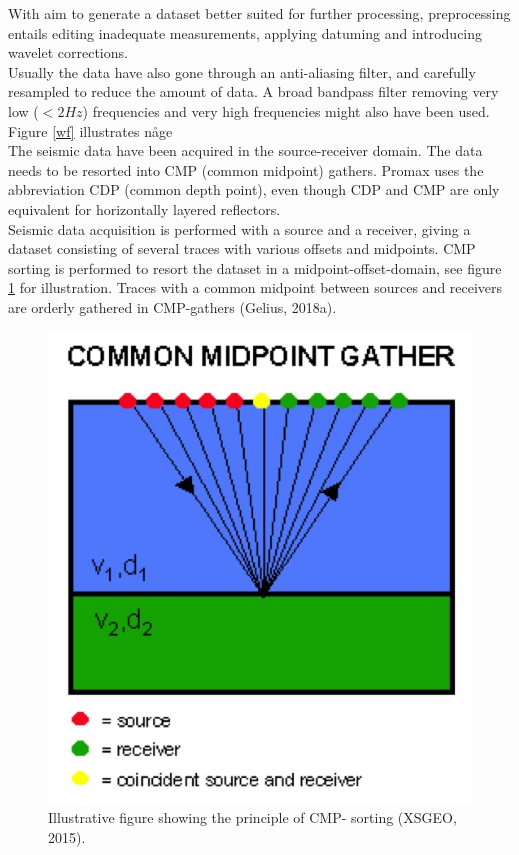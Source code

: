 \documentclass[10pt,a4paper]{article}
\begin{document}
With aim to generate a dataset better suited for further processing, preprocessing entails editing inadequate measurements, applying datuming and introducing wavelet corrections.\\
Usually the data have also gone through an anti-aliasing filter, and carefully resampled to reduce the amount of data. A broad bandpass filter removing very low ($<2Hz$) frequencies and very high frequencies might also have been used.
\\
Figure \ref{wf} illustrates någe
\\
The seismic data have been acquired in the source-receiver domain. The data needs to be resorted into CMP (common midpoint) gathers. Promax uses the abbreviation CDP (common depth point), even though CDP and CMP are only equivalent for horizontally layered reflectors.
\\
\noindent Seismic data acquisition is performed with a source and a receiver, giving a dataset consisting of several traces with various offsets and midpoints. CMP sorting is performed to resort the dataset in a midpoint-offset-domain, see figure \ref{fig1} for illustration. Traces with a common midpoint between sources and receivers are orderly gathered in CMP-gathers (Gelius, 2018a).

\begin{figure}[H]
\includegraphics[scale=0.6]{fig1.jpg}
\caption{Illustrative figure showing the principle of CMP- sorting (XSGEO, 2015).}
\label{fig1}
\end{figure}
\end{document}
